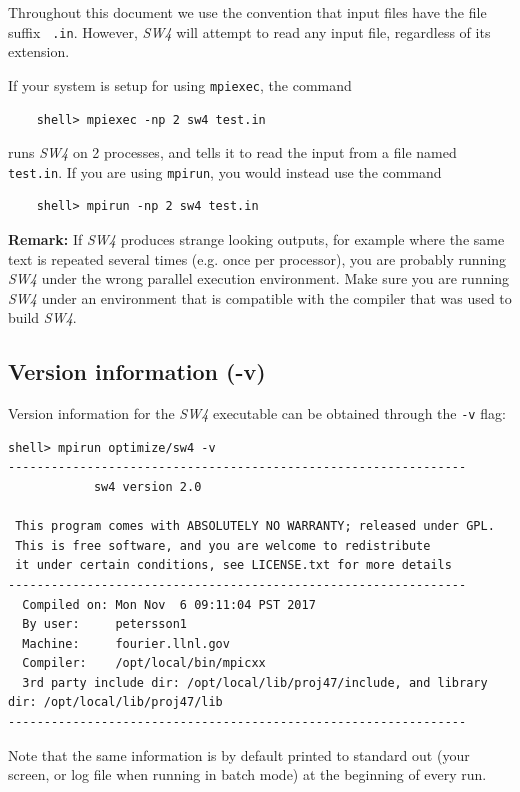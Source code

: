 \documentclass[11pt]{report}
\begin{document}
Throughout this document we use the convention that input files have the file suffix {\tt
  .in}. However, \emph{SW4} will attempt to read any input file, regardless of its extension.

If your system is setup for using \verb+mpiexec+, the command
\begin{verbatim}
	shell> mpiexec -np 2 sw4 test.in
\end{verbatim}
runs \emph{SW4} on 2 processes, and tells it to read the input from a file named {\tt test.in}.  If you
are using \verb+mpirun+, you would instead use the command
\begin{verbatim}
	shell> mpirun -np 2 sw4 test.in
\end{verbatim}
{\bf Remark: } If \emph{SW4} produces strange looking outputs, for example where the same text is
repeated several times (e.g. once per processor), you are probably running \emph{SW4} under the
wrong parallel execution environment. Make sure you are running \emph{SW4} under an environment that
is compatible with the compiler that was used to build \emph{SW4}.
%

\subsection{Version information (-v)}

Version information for the \emph{SW4} executable can be obtained through the {\tt -v} flag:
\begin{verbatim}
shell> mpirun optimize/sw4 -v
----------------------------------------------------------------
            sw4 version 2.0

 This program comes with ABSOLUTELY NO WARRANTY; released under GPL.
 This is free software, and you are welcome to redistribute     
 it under certain conditions, see LICENSE.txt for more details  
----------------------------------------------------------------
  Compiled on: Mon Nov  6 09:11:04 PST 2017
  By user:     petersson1
  Machine:     fourier.llnl.gov
  Compiler:    /opt/local/bin/mpicxx
  3rd party include dir: /opt/local/lib/proj47/include, and library dir: /opt/local/lib/proj47/lib
----------------------------------------------------------------
\end{verbatim}
Note that the same information is by default printed to standard out (your screen, or log file when
running in batch mode) at the beginning of every run.
\end{document}
